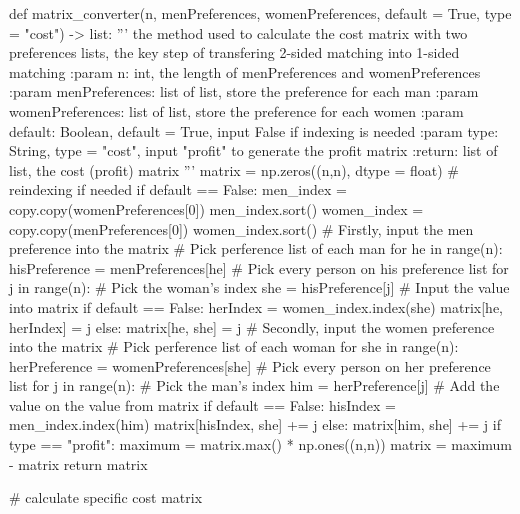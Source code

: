 \documentclass[14pt]{extarticle}
\begin{document}
\begin{python}
def matrix_converter(n, menPreferences, womenPreferences, default = True, type = "cost") -> list:
    '''
    the method used to calculate the cost matrix with two preferences lists, the key step of transfering 2-sided matching into 1-sided matching
    :param n: int, the length of menPreferences and womenPreferences
    :param menPreferences: list of list, store the preference for each man
    :param womenPreferences: list of list, store the preference for each women
    :param default: Boolean, default = True, input False if indexing is needed
    :param type: String, type = "cost", input "profit" to generate the profit matrix
    :return: list of list, the cost (profit) matrix
    '''
    matrix = np.zeros((n,n), dtype = float)
    # reindexing if needed
    if default == False:
        men_index = copy.copy(womenPreferences[0])
        men_index.sort()
        women_index = copy.copy(menPreferences[0])
        women_index.sort()
    # Firstly, input the men preference into the matrix
    # Pick perference list of each man
    for he in range(n):
        hisPreference = menPreferences[he]
        # Pick every person on his preference list
        for j in range(n):
            # Pick the woman's index 
            she = hisPreference[j]   
            # Input the value into matrix
            if default == False:
                herIndex = women_index.index(she)
                matrix[he, herIndex] = j
            else:                 
                matrix[he, she] = j  
    # Secondly, input the women preference into the matrix
    # Pick perference list of each woman
    for she in range(n):
        herPreference = womenPreferences[she]
        # Pick every person on her preference list
        for j in range(n):
            # Pick the man's index 
            him = herPreference[j]
            # Add the value on the value from matrix
            if default == False:
                hisIndex = men_index.index(him)
                matrix[hisIndex, she] += j
            else:
                matrix[him, she] += j    
    if type == "profit":        
        maximum = matrix.max() * np.ones((n,n))
        matrix = maximum - matrix
    return matrix  

# calculate specific cost matrix


\end{python}
\end{document}
